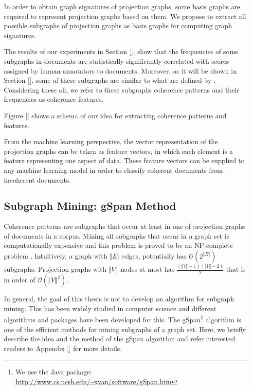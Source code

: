 In order to obtain graph signatures of projection graphs, some basis graphs are required to represent projection graphs based on them. 
We propose to extract all possible subgraphs of projection graphs as basis graphs for computing graph signatures. 

The results of our experiments in Section \ref{}, show that the frequencies of some subgraphs in documents are statistically significantly correlated with scores assigned by human annotators to documents. 
Moreover, as it will be shown in Section \ref{}, some of these subgraphs are similar to what are defined by . 
Considering these all, we refer to these subgraphs coherence patterns and their frequencies as coherence features.  

Figure \ref{} shows a schema of our idea for extracting coherence patterns and features. 

From the machine learning perspective, the vector representation of the projection graphs can be taken as feature vectors, in which each element is a feature representing one aspect of data. 
These feature vectors can be supplied to any machine learning model in order to classify coherent documents from incoherent documents. 

\subsection{Subgraph Mining: gSpan Method}
\label{subsec:subgraph_mining_gspan}
%
Coherence patterns are subgraphs that occur at least in one of projection graphs of documents in a corpus. 
Mining all subgraphs that occur in a graph set is computationally expensive and this problem is proved to be an NP-complete problem \cite{}. 
Intuitively, a graph with $\Vert E \Vert$ edges, potentially has $\mathcal{O} \left( 2^{\Vert E \Vert} \right)$ subgraphs.  
Projection graphs with $\Vert V \Vert$ nodes at most has  $\frac{(\Vert V \Vert-1)(\Vert V \Vert-2)}{2}$ that is in order of $\mathcal{O} \left( \Vert V \Vert ^2 \right)$.  

In general, the goal of this thesis is not to develop an algorithm for subgraph mining. 
This has been widely studied in computer science and different algorithms and packages have been developed for this. 
The gSpan\footnote{We use the Java package: \url{http://www.cs.ucsb.edu/~xyan/software/gSpan.htm}}  algorithm \cite{yanxifeng02} is one of the efficient methods for mining subgraphs of a  graph set. 
Here, we briefly describe the idea and the method of the gSpan algorithm and refer interested readers to Appendix \ref{} for more details. 

